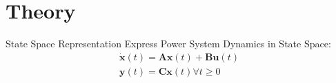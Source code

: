 \section[Theory]{Theory}
\label{sec:lasso_theory}

\begin{frame}[fragile]{State Space Representation}
	Express Power System Dynamics in State Space:
	\begin{equation}
		\label{eq:ssr}
		\begin{split}
			\dot{\textbf{x}}(t) = 
			\textbf{A}\textbf{x}(t)
			+ \textbf{B}\textbf{u}(t)\\
			\textbf{y}(t) = 
			\textbf{C}\textbf{x}(t)  
			\forall t\geq0
		\end{split}
	\end{equation}
\end{frame}